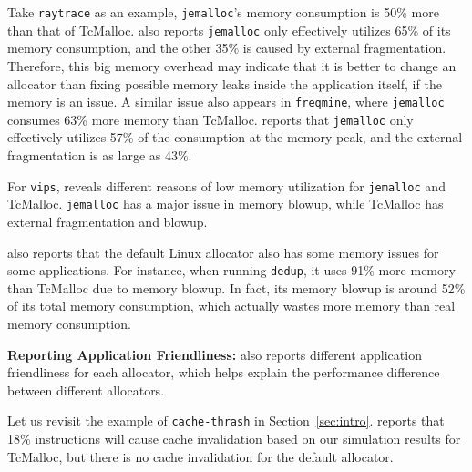 Take \texttt{raytrace} as an example,  \texttt{jemalloc}'s memory consumption is 50\% more than that of TcMalloc. \MP{} also reports \texttt{jemalloc} only effectively utilizes 65\% of its memory consumption, and the other 35\% is caused by external fragmentation. Therefore, this big memory overhead may indicate that it is better to change an allocator than fixing possible memory leaks inside the application itself, if the memory is an issue. A similar issue also appears in \texttt{freqmine}, where \texttt{jemalloc} consumes 63\% more memory than TcMalloc.
\MP{} reports that \texttt{jemalloc} only effectively utilizes 57\% of the consumption at the memory peak, and the external fragmentation is as large as 43\%.

For \texttt{vips}, \MP{} reveals different reasons of low memory utilization for \texttt{jemalloc} and TcMalloc. \texttt{jemalloc} has a major issue in memory blowup, while TcMalloc has external fragmentation and blowup.

\MP{} also reports that the default Linux allocator also has some memory issues for some applications. For instance, when running \texttt{dedup}, it uses 91\% more memory than TcMalloc due to memory blowup. In fact, its memory blowup is around 52\% of its total memory consumption, which actually wastes more memory than real memory consumption. 


\textbf{Reporting Application Friendliness:} 
\MP{} also reports different application friendliness for each allocator, which helps explain the performance difference between different allocators. 

Let us revisit the example of \texttt{cache-thrash} in Section~\ref{sec:intro}. \MP{} reports that 18\% instructions will cause cache invalidation based on our simulation results for TcMalloc, but there is no cache invalidation for the default allocator. 



